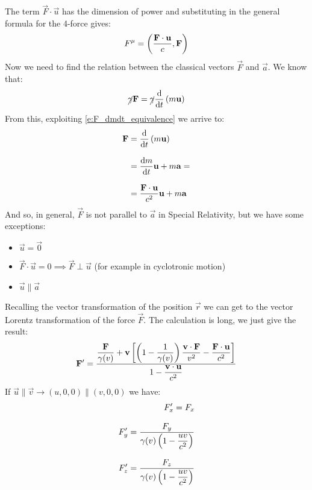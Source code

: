 The term $\vec{F}\cdot\vec{u}$ has the dimension of power and substituting in the general formula for the 4-force gives:
\begin{equation}
  F^{\mu} = \left(\dfrac{\vb{F}\cdot\vb{u}}{c}, \vb{F}\right)
\end{equation}
Now we need to find the relation between the classical vectors $\vec{F}$ and $\vec{a}$. We know that:
\begin{equation}
  \cancel{\gamma} \vec{F} = \cancel{\gamma} \dv{}{t}\brackets{m\vec{u}}
\end{equation}
From this, exploiting \eqref{e:F_dmdt_equivalence} we arrive to:
\begin{equation}
  \begin{split}
    \vec{F} &= \dv{}{t}\brackets{m\vec{u}} \\[8pt]
    &= \dv{m}{t}\vec{u} + m\vec{a} = \\[8pt]
    &= \dfrac{\vec{F}\cdot\vec{u}}{c^2}\vec{u} + m\vec{a}
  \end{split}
\end{equation}
And so, in general, $\vec{F}$ is not parallel to $\vec{a}$ in Special Relativity, but we have some exceptions:
\begin{itemize}
  \item $\vec{u} = \vec{0}$
  \item $\vec{F}\cdot\vec{u} = 0 \implies \vec{F} \perp \vec{u}$ (for example in cyclotronic motion)
  \item $\vec{u} \parallel \vec{a}$
\end{itemize}
Recalling the vector transformation of the position $\vec{r}$ we can get to the vector Lorentz transformation of the force $\vec{F}$. The calculation is long, we just give the result:
\begin{equation}
  \vb{F}' = \dfrac{\dfrac{\vb{F}}{\gamma (v)} + \vb{v}\left[\left(1- \dfrac{1}{\gamma(v)}\right)\dfrac{\vb{v}\cdot \vb{F}}{v^2}-\dfrac{\vb{F}\cdot \vb{u}}{c^2}\right]}{1-\dfrac{\vb{v}\cdot\vb{u}}{c^2}}
\end{equation}
If $\vec{u} \parallel \vec{v} \rightarrow (u, 0, 0) \parallel (v, 0, 0)$ we have:
\begin{equation}
  \begin{split}
    F'_x = F_x \\[8pt]
    F'_y = \dfrac{F_y}{\gamma(v)\left(1-\dfrac{uv}{c^2}\right)}\\[8pt]
    F'_z = \dfrac{F_z}{\gamma(v)\left(1-\dfrac{uv}{c^2}\right)}
  \end{split}
\end{equation}
